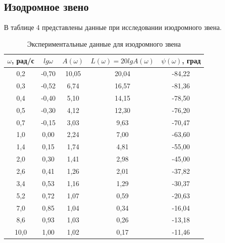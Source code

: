 \documentclass[12pt,a4paper]{article}
\begin{document}
\newpage
\begin{center}
\section{Изодромное звено}
\end{center}

В таблице 4 представлены данные при исследовании изодромного звена.
\begin{table}[h!]
	\renewcommand{\arraystretch}{1.8} %
	\centering
	\begin{threeparttable}
	\caption{Экспериментальные данные для изодромного звена}
	\begin{tabular}{|c|c|c|c|c|}
		\hline $\omega$, рад/с & $lg\omega$ & $A(\omega)$ & $L(\omega)=20lgA(\omega)$ & $\psi(\omega)$, град\\
		\hline 0,2 & -0,70 & 10,05 & 20,04 & -84,22\\
		\hline 0,3 & -0,52 & 6,74 & 16,57 & -81,36\\
		\hline 0,4 & -0,40 & 5,10 & 14,15 & -78,50\\
		\hline 0,5 & -0,30 & 4,12 & 12,30 & -76,20\\
		\hline 0,7 & -0,15 & 3,03 & 9,63 & -70,47\\
		\hline 1,0 & 0,00 & 2,24 & 7,00 & -63,60\\
		\hline 1,4 & 0,15 & 1,74 & 4,81 & -55,00\\
		\hline 2,0 & 0,30 & 1,41 & 2,98 & -45,00\\
		\hline 2,6 & 0,41 & 1,26 & 2,01 & -37,82\\
		\hline 3,4 & 0,53 & 1,16 & 1,29 & -30,37\\
		\hline 5,2 & 0,72 & 1,07 & 0,59 & -20,63\\
		\hline 7,0 & 0,85 & 1,04 & 0,34 & -16,04\\
		\hline 8,6 & 0,93 & 1,03 & 0,26 & -13,18\\
		\hline 10,0 & 1,00 & 1,02 & 0,17 & -11,46\\
		\hline
	\end{tabular}
	\end{threeparttable}
\end{table}
\end{document}
